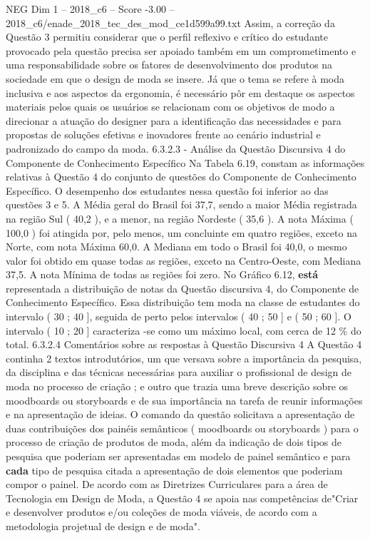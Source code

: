 \begin{textsample}{NEG Dim 1 – 2018\_c6 – Score -3.00 – 2018\_c6/enade\_2018\_tec\_des\_mod\_ce1d599a99.txt}
Assim, a correção da Questão 3 permitiu considerar que o perfil reflexivo e crítico do estudante provocado pela questão precisa ser apoiado também em um comprometimento e uma responsabilidade sobre os fatores de desenvolvimento dos produtos na sociedade em que o design de moda se insere.
Já que o tema se refere à moda inclusiva e aos aspectos da ergonomia, é necessário pôr em destaque os aspectos materiais pelos quais os usuários se relacionam com os objetivos de modo a direcionar a atuação do designer para a identificação das necessidades e para propostas de soluções efetivas e inovadores frente ao cenário industrial e padronizado do campo da moda. 6.3.2.3 - Análise da Questão Discursiva 4 do Componente de Conhecimento Específico Na Tabela 6.19, constam as informações relativas à Questão 4 do conjunto de questões do Componente de Conhecimento Específico.
O desempenho dos estudantes nessa questão foi inferior ao das questões 3 e 5.
A Média geral do Brasil foi 37,7, sendo a maior Média registrada na região Sul ( 40,2 ), e a menor, na região Nordeste ( 35,6 ).
A nota Máxima ( 100,0 ) foi atingida por, pelo menos, um concluinte em quatro regiões, exceto na Norte, com nota Máxima 60,0.
A Mediana em todo o Brasil foi 40,0, o mesmo valor foi obtido em quase todas as regiões, exceto na Centro-Oeste, com Mediana 37,5.
A nota Mínima de todas as regiões foi zero.
No Gráfico 6.12, \textbf{está} representada a distribuição de notas da Questão discursiva 4, do Componente de Conhecimento Específico.
Essa distribuição tem moda na classe de estudantes do intervalo ( 30 ; 40 ], seguida de perto pelos intervalos ( 40 ; 50 ] e ( 50 ; 60 ].
O intervalo ( 10 ; 20 ] caracteriza -se como um máximo local, com cerca de 12 \% do total. 6.3.2.4 Comentários sobre as respostas à Questão Discursiva 4 A Questão 4 continha 2 textos introdutórios, um que versava sobre a importância da pesquisa, da disciplina e das técnicas necessárias para auxiliar o profissional de design de moda no processo de criação ; e outro que trazia uma breve descrição sobre os moodboards ou storyboards e de sua importância na tarefa de reunir informações e na apresentação de ideias.
O comando da questão solicitava a apresentação de duas contribuições dos painéis semânticos ( moodboards ou storyboards ) para o processo de criação de produtos de moda, além da indicação de dois tipos de pesquisa que poderiam ser apresentadas em modelo de painel semântico e para \textbf{cada} tipo de pesquisa citada a apresentação de dois elementos que poderiam compor o painel.
De acordo com as Diretrizes Curriculares para a área de Tecnologia em Design de Moda, a Questão 4 se apoia nas competências de"Criar e desenvolver produtos e/ou coleções de moda viáveis, de acordo com a metodologia projetual de design e de moda".

\end{textsample}
